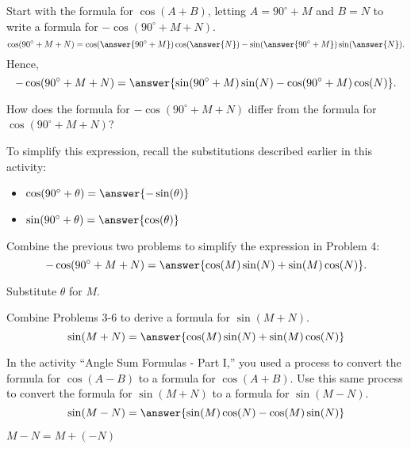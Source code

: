 \documentclass[number]{ximera}
\begin{document}
\begin{problem}
Start with the formula for $\cos(A+B)$, letting $A=90^\circ+M$ and $B=N$ to write a formula for $-\cos(90^\circ+M+N)$.
\[\cos(90^\circ+M+N)=\cos(\answer{90^\circ+M})\cos(\answer{N})-\sin(\answer{90^\circ+M})\sin(\answer{N}).\]
Hence,
\[-\cos(90^\circ+M+N)=\answer{\sin(90^\circ+M)\sin(N)-\cos(90^\circ+M)\cos(N)}.\]
\begin{hint}
How does the formula for $-\cos(90^\circ+M+N)$ differ from the formula for $\cos(90^\circ+M+N)$?
\end{hint}

\end{problem}

\begin{problem}
To simplify this expression, recall the substitutions described earlier in this activity:
\begin{itemize}
\item $\cos(90^\circ+\theta)=\answer{-\sin(\theta)}$
\item $\sin(90^\circ+\theta)=\answer{\cos(\theta)}$
\end{itemize}

\end{problem}

\begin{problem}
Combine the previous two problems to simplify the expression in Problem 4:
\[-\cos(90^\circ+M+N)=\answer{\cos(M)\sin(N)+\sin(M)\cos(N)}.\]
\begin{hint}
Substitute $\theta$ for $M$.
\end{hint}

\end{problem}

\begin{problem}
Combine Problems 3-6 to derive a formula for $\sin(M+N)$.
\[\sin(M+N)=\answer{\cos(M)\sin(N)+\sin(M)\cos(N)}\]
\end{problem}

\begin{problem}
In the activity ``Angle Sum Formulas - Part I,'' you used a process to convert the formula for $\cos(A-B)$ to a formula for $\cos(A+B)$. Use this same process to convert the formula for $\sin(M+N)$ to a formula for $\sin(M-N)$.
\[\sin(M-N)=\answer{\sin(M)\cos(N)-\cos(M)\sin(N)}\]
\begin{hint}
$M-N=M+(-N)$
\end{hint}

\end{problem}
\end{document}
